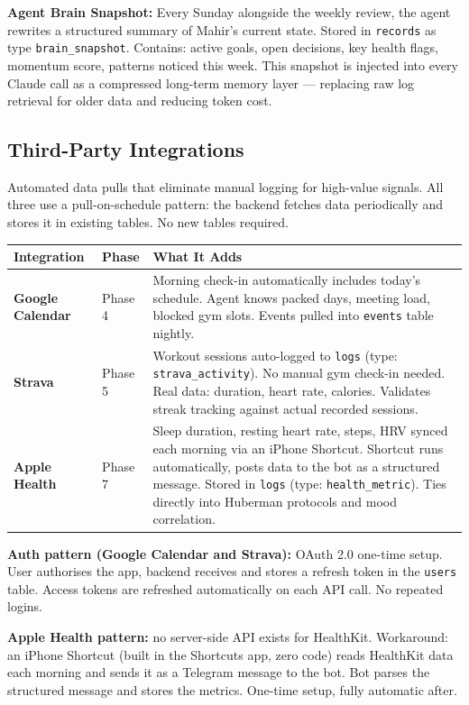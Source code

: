 \documentclass[12pt, a4paper]{article}
\begin{document}
\textbf{Agent Brain Snapshot:} Every Sunday alongside the weekly review, the agent rewrites a structured summary of Mahir's current state. Stored in \texttt{records} as type \texttt{brain\_snapshot}. Contains: active goals, open decisions, key health flags, momentum score, patterns noticed this week. This snapshot is injected into every Claude call as a compressed long-term memory layer --- replacing raw log retrieval for older data and reducing token cost.

\subsection{Third-Party Integrations}

Automated data pulls that eliminate manual logging for high-value signals. All three use a pull-on-schedule pattern: the backend fetches data periodically and stores it in existing tables. No new tables required.

\begin{longtable}{>{\bfseries}p{3cm} p{4cm} p{7cm}}
\toprule
Integration & Phase & What It Adds \\
\midrule
Google Calendar & Phase 4 & Morning check-in automatically includes today's schedule. Agent knows packed days, meeting load, blocked gym slots. Events pulled into \texttt{events} table nightly. \\
\addlinespace
Strava & Phase 5 & Workout sessions auto-logged to \texttt{logs} (type: \texttt{strava\_activity}). No manual gym check-in needed. Real data: duration, heart rate, calories. Validates streak tracking against actual recorded sessions. \\
\addlinespace
Apple Health & Phase 7 & Sleep duration, resting heart rate, steps, HRV synced each morning via an iPhone Shortcut. Shortcut runs automatically, posts data to the bot as a structured message. Stored in \texttt{logs} (type: \texttt{health\_metric}). Ties directly into Huberman protocols and mood correlation. \\
\bottomrule
\end{longtable}

\textbf{Auth pattern (Google Calendar and Strava):} OAuth 2.0 one-time setup. User authorises the app, backend receives and stores a refresh token in the \texttt{users} table. Access tokens are refreshed automatically on each API call. No repeated logins.

\textbf{Apple Health pattern:} no server-side API exists for HealthKit. Workaround: an iPhone Shortcut (built in the Shortcuts app, zero code) reads HealthKit data each morning and sends it as a Telegram message to the bot. Bot parses the structured message and stores the metrics. One-time setup, fully automatic after.
\end{document}
